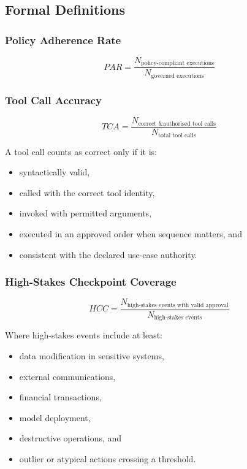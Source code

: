 \documentclass[11pt,a4paper]{article}
\begin{document}
\subsection{Formal Definitions}

\subsubsection{Policy Adherence Rate}

\begin{equation}
PAR = \frac{N_{\text{policy-compliant executions}}}{N_{\text{governed executions}}}
\end{equation}

\subsubsection{Tool Call Accuracy}

\begin{equation}
TCA = \frac{N_{\text{correct \& authorised tool calls}}}{N_{\text{total tool calls}}}
\end{equation}

A tool call counts as correct only if it is:

\begin{itemize}[nosep]
    \item syntactically valid,
    \item called with the correct tool identity,
    \item invoked with permitted arguments,
    \item executed in an approved order when sequence matters, and
    \item consistent with the declared use-case authority.
\end{itemize}

\subsubsection{High-Stakes Checkpoint Coverage}

\begin{equation}
HCC = \frac{N_{\text{high-stakes events with valid approval}}}{N_{\text{high-stakes events}}}
\end{equation}

Where high-stakes events include at least:

\begin{itemize}[nosep]
    \item data modification in sensitive systems,
    \item external communications,
    \item financial transactions,
    \item model deployment,
    \item destructive operations, and
    \item outlier or atypical actions crossing a threshold.
\end{itemize}
\end{document}
